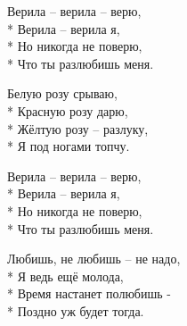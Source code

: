 \medskip

\begin{minipage}{\linewidth}
\hspace*{1.5em}Верила – верила – верю,\\*
\hspace*{1.5em}Верила – верила я,\\*
\hspace*{1.5em}Но никогда не поверю,\\*
\hspace*{1.5em}Что ты разлюбишь меня.\\
\end{minipage}\par\medskip\nobreak

\medskip

\begin{minipage}{\linewidth}
Белую розу срываю,\\*
Красную розу дарю,\\*
Жёлтую розу – разлуку,\\*
Я под ногами топчу.\\
\end{minipage}\par\medskip\nobreak

\medskip

\begin{minipage}{\linewidth}
\hspace*{1.5em}Верила – верила – верю,\\*
\hspace*{1.5em}Верила – верила я,\\*
\hspace*{1.5em}Но никогда не поверю,\\*
\hspace*{1.5em}Что ты разлюбишь меня.\\
\end{minipage}\par\medskip\nobreak

\medskip

\begin{minipage}{\linewidth}
Любишь, не любишь – не надо,\\*
Я ведь ещё молода,\\*
Время настанет полюбишь -\\*
Поздно уж будет тогда.\\
\end{minipage}\par\medskip\nobreak

\medskip

